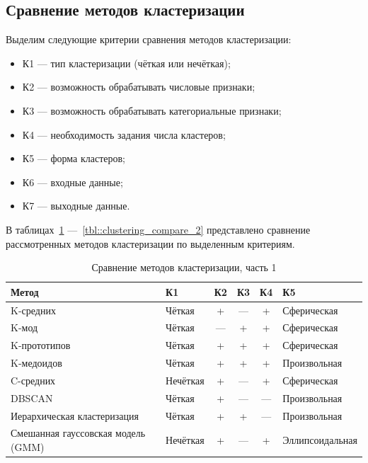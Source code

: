 \subsection{Сравнение методов кластеризации}

Выделим следующие критерии сравнения методов кластеризации:
\begin{itemize}
	\item[---] К1 --- тип кластеризации (чёткая или нечёткая);
	\item[---] К2 --- возможность обрабатывать числовые признаки;
	\item[---] К3 --- возможность обрабатывать категориальные признаки;
	\item[---] К4 --- необходимость задания числа кластеров;
	\item[---] К5 --- форма кластеров;
	\item[---] К6 --- входные данные;
	\item[---] К7 --- выходные данные.
\end{itemize}

В таблицах~\ref{tbl::clustering_compare_1} ---~\ref{tbl::clustering_compare_2} представлено сравнение рассмотренных методов кластеризации по выделенным критериям.

\begin{table}[H]
	\centering
	\caption{Сравнение методов кластеризации, часть 1}
	\begin{tabular}{|p{7cm}|l|c|c|c|l|}
		\hline
		\textbf{Метод} & \textbf{К1} & \textbf{К2} & \textbf{К3} & \textbf{К4} & \textbf{К5} \\
		\hline
		K-средних
		& Чёткая
		& +
		& ---
		& +
		& Сферическая
		\\
		\hline
		K-мод
		& Чёткая
		& ---
		& +
		& +
		& Сферическая
		\\
		\hline
		K-прототипов
		& Чёткая
		& +
		& +
		& +
		& Сферическая
		\\
		\hline
		K-медоидов
		& Чёткая
		& +
		& +
		& +
		& Произвольная
		\\
		\hline
		C-средних
		& Нечёткая
		& +
		& ---
		& +
		& Сферическая
		\\
		\hline
		DBSCAN
		& Чёткая
		& +
		& ---
		& ---
		& Произвольная
		\\
		\hline
		Иерархическая кластеризация
		& Чёткая
		& +
		& +
		& ---
		& Произвольная
		\\
		\hline
		Смешанная гауссовская модель (GMM)
		& Нечёткая
		& +
		& ---
		& +
		& Эллипсоидальная
		\\
		\hline
	\end{tabular}
	\label{tbl::clustering_compare_1}
\end{table}



